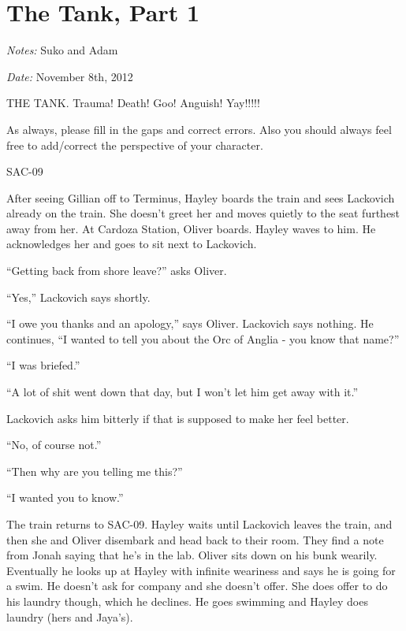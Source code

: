 \setcounter{chapter}{ 9 }
\chapter{\textbf{The Tank, Part 1} }






\textit{Notes:} Suko and Adam

\textit{Date:} November 8th, 2012



THE TANK.  Trauma!  Death!  Goo!  Anguish!   Yay!!!!!



As always, please fill in the gaps and correct errors.  Also you should always feel free to add/correct the perspective of your character.



\noindent\hrulefill





 {\LARGE SAC-09 } 



After seeing Gillian off to Terminus, Hayley boards the train and sees Lackovich already on the train.  She doesn't greet her and moves quietly to the seat furthest away from her.  At Cardoza Station, Oliver boards.  Hayley waves to him. He acknowledges her and goes to sit next to Lackovich.



``Getting back from shore leave?'' asks Oliver.

``Yes,'' Lackovich says shortly.

``I owe you thanks and an apology,'' says Oliver.  Lackovich says nothing.  He continues, ``I wanted to tell you about the Orc of Anglia - you know that name?''

``I was briefed.''

``A lot of shit went down that day, but I won't let him get away with it.''

Lackovich asks him bitterly if that is supposed to make her feel better.

``No, of course not.''

``Then why are you telling me this?''

``I wanted you to know.''



The train returns to SAC-09.  Hayley waits until Lackovich leaves the train, and then she and Oliver disembark and head back to their room.  They find a note from Jonah saying that he's in the lab.  Oliver sits down on his bunk wearily.  Eventually he looks up at Hayley with infinite weariness and says he is going for a swim.  He doesn't ask for company and she doesn't offer.  She does offer to do his laundry though, which he declines.  He goes swimming and Hayley does laundry (hers and Jaya's).



